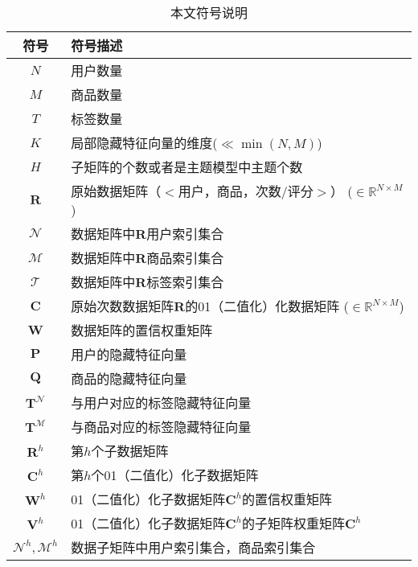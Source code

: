 \newpage

\pagestyle{empty}

\begin{table}[htbp]
	\centering
	\caption{本文符号说明}
	\label{tab-basic-notation}%
	
	\begin{tabular}{cp{}}
		\hline
		符号 & 符号描述 \bigstrut \\
		\hline\hline
		$N$  & 用户数量 \bigstrut \\
		$M$ & 商品数量 \bigstrut \\
		$T$ & 标签数量 \bigstrut \\
		$K$     & 局部隐藏特征向量的维度($\ll \min(N,M)$)\bigstrut\\
		$H$     & 子矩阵的个数或者是主题模型中主题个数\bigstrut\\
		\hline
		$\mathbf{R}$     & 原始数据矩阵（$<$用户，商品，次数/评分$>$） ($\in \mathbb{R}^{N\times M}$) \bigstrut\\
		$ \mathcal{N}$ & 数据矩阵中$\mathbf{R}$用户索引集合 \bigstrut\\
		$ \mathcal{M}$ & 数据矩阵中$\mathbf{R}$商品索引集合 \bigstrut\\
		$ \mathcal{T}$ & 数据矩阵中$\mathbf{R}$标签索引集合 \bigstrut\\
		\hline
		$\mathbf{C}$     & 原始次数数据矩阵$\mathbf{R}$的01（二值化）化数据矩阵 ($\in \mathbb{R}^{N\times M}$)   \bigstrut\\
		$\mathbf{W}$ & 数据矩阵的置信权重矩阵\bigstrut\\
		$\mathbf{P}$  & 用户的隐藏特征向量 \bigstrut\\
		$\mathbf{Q}$  & 商品的隐藏特征向量 \bigstrut\\
		$\mathbf{T}^\mathcal{N}$  & 与用户对应的标签隐藏特征向量 \bigstrut\\
		$\mathbf{T}^\mathcal{M}$  & 与商品对应的标签隐藏特征向量 \bigstrut\\
		\hline
		$\mathbf{R}^h$ & 第$h$个子数据矩阵 \bigstrut\\
		$\mathbf{C}^h$ &第$h$个01（二值化）化子数据矩阵  \bigstrut\\
		$ \mathbf{W}^h$ &01（二值化）化子数据矩阵$\mathbf{C}^h$的置信权重矩阵\bigstrut\\
		$ \mathbf{V}^h$ & 01（二值化）化子数据矩阵$\mathbf{C}^h$的子矩阵权重矩阵$ \mathbf{C}^h$\bigstrut\\
		$ \mathcal{N}^h,  \mathcal{M}^h$ & 数据子矩阵中用户索引集合，商品索引集合 \bigstrut\\

\end{tabular}
\end{table}
